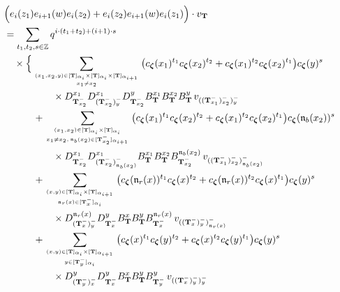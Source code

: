 \documentclass[12pt]{amsart}
\numberwithin{equation}{thm}
\newcommand\ZZ{\mathbb Z}
\newcommand\bT{\mathbf T}
\newcommand\fn{\mathfrak n}
\renewcommand\a{\alpha}  %
\newcommand\Bz{\boldsymbol\zeta}
\begin{document}
\begin{align}
\label{z1 w z2 z2 w z1}
& \Big( e_i(z_1) e_{i+1} (w) e_i(z_2) + e_i(z_2) e_{i+1} (w) e_i(z_1) \Big) \cdot v_{\bT} 
\\
&\notag 
= \sum_{t_1,t_2,s \in \ZZ} q^{i \cdot (t_1 + t_2) + (i+1) \cdot s} 
	\\ \notag & \quad \times \Big\{ 
	\sum_{( x_1, x_2, y) \in [\bT]_{\a_i} \times [\bT]_{\a_i} \times [\bT]_{\a_{i+1}} \atop x_1 \not= x_2 } 
		\big( c_{\Bz} (x_1)^{t_1} c_{\Bz} (x_2)^{t_2} + c_{\Bz} (x_1)^{t_2} c_{\Bz} (x_2)^{t_1} \big) c_{\Bz} (y)^s 
		\\ \notag & \hspace{5em} \times 
		D_{\bT_{x_2}^-}^{x_1} D_{(\bT_{x_2}^-)_y^-}^{x_1} D_{\bT_{x_2}^-}^y 
		B_{\bT}^{x_1} B_{\bT}^{x_2} B_{\bT}^y 
		\, v_{((\bT_{x_1}^-)_{x_2}^-)_y^-} 
	\\ \notag & \hspace{3em} 
	+ \sum_{(x_1,x_2) \in [\bT]_{\a_i} \times [\bT]_{\a_i} \atop x_1 \not= x_2, \, \fn_b (x_2) \in [\bT_{x_2}^-]_{\a_{i+1}}} 
		\big( c_{\Bz} (x_1)^{t_1} c_{\Bz} (x_2)^{t_2} + c_{\Bz} (x_1)^{t_2} c_{\Bz} (x_2)^{t_1} \big) c_{\Bz} (\fn_b (x_2))^s 
		\\ \notag & \hspace{5em} \times 
		D_{\bT_{x_2}^-}^{x_1} D_{(\bT_{x_2}^-)_{\fn_b (x_2)}^-}^{x_1} 
		B_{\bT}^{x_1} B_{\bT}^{x_2}  B_{\bT_{x_2}^-}^{\fn_b (x_2)} 
		\, v_{((\bT_{x_1}^-)_{x_2}^-)_{\fn_b(x_2)}^-} 
	\\ \notag & \hspace{3em} 
	+ \sum_{(x,y) \in [\bT]_{\a_i} \times [\bT]_{\a_{i+1}} \atop \fn_r(x) \in [\bT_x^-]_{\a_i}} 
		\big( c_{\Bz} (\fn_r (x))^{t_1} c_{\Bz} (x)^{t_2} +  c_{\Bz} (\fn_r (x))^{t_2} c_{\Bz} (x)^{t_1} \big) c_{\Bz} (y)^s 
		\\ \notag & \hspace{5em} \times 
		D_{(\bT_{x}^-)_y^-}^{\fn_r (x)} D_{\bT_x^-}^y 
		B_{\bT}^x B_{\bT}^y B_{\bT_x^-}^{\fn_r(x)}  
		\, v_{((\bT_x^-)_y^-)_{\fn_r(x)}^-} 
	\\ \notag & \hspace{3em} 
	+ \sum_{(x,y) \in [\bT]_{\a_i} \times [\bT]_{\a_{i+1}} \atop y \in [\bT_y^-]_{\a_i}} 
		\big( c_{\Bz}(x)^{t_1} c_{\Bz} (y)^{t_2}  + c_{\Bz}(x)^{t_2} c_{\Bz} (y)^{t_1}   \big) c_{\Bz}(y)^s 
		\\ \notag & \hspace{5em} \times 
		D_{(\bT_y^-)_x^-}^y D_{\bT_x^-}^y 
		B_{\bT}^x B_{\bT}^y B_{\bT_y^-}^y 
		\, v_{((\bT_x^-)_y^-)_y^-} 
	\\ \notag & \hspace{3em} 

\end{align}
\end{document}
